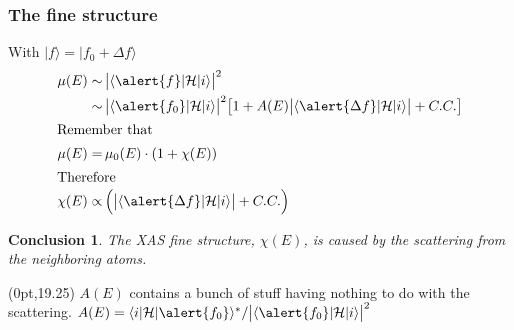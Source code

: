\documentclass[10pt, xcolor=x11names, compress]{beamer}
\begin{document}
\newtheorem{conclusion}[theorem]{Conclusion}
\begin{frame}
  \frametitle{The fine structure}
  With $|f\rangle = |f_0+\Delta f\rangle$
  \begin{align}
    \mu(E) \sim&\, \big|\langle \alert{f}| \mathcal{H}|i\rangle\big|^2
    \notag\\
    \sim&\, \big|\langle \alert{f_0}| \mathcal{H}|i\rangle\big|^2
    \big[
    1 + A(E)
    \big|\langle \alert{\Delta f}| \mathcal{H}|i\rangle\big|
    + C.C.
    \big]\notag\\
    \intertext{Remember that}
    \mu(E) =&\, \mu_0(E) \cdot (1+\chi(E))\notag\\
    \intertext{Therefore}
    \chi(E) \propto&\,\Big(\big|\langle \alert{\Delta f}|
    \mathcal{H}|i\rangle\big| + C.C.\Big)\notag
  \end{align}

  \begin{conclusion}
    The XAS fine structure, $\chi(E)$, is caused by the scattering from
    the neighboring atoms.
  \end{conclusion}

  \begin{textblock*}{0.6\linewidth}(0pt,19.25\TPVertModule)%
    \tiny%
    $A(E)$ contains a bunch of stuff having nothing to do with the
    scattering. $A(E) = \langle
      i|\mathcal{H}|\alert{f_0}\rangle^\ast / \big|\langle
      \alert{f_0}| \mathcal{H}|i\rangle\big|^2$
  \end{textblock*}
\end{frame}
\end{document}
